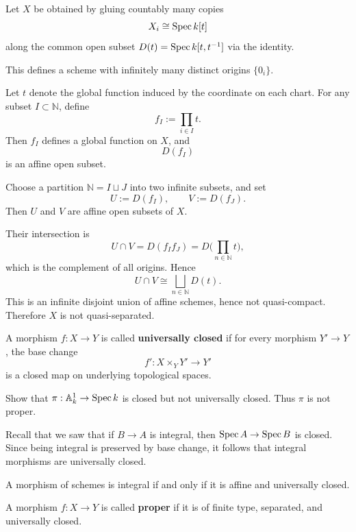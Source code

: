 \documentclass[12pt]{article}
\begin{document}
\begin{example}
    Let $X$ be obtained by gluing countably many copies
    \[
        X_i \cong \operatorname{Spec} k[t]
    \]
    along the common open subset $D(t)=\operatorname{Spec} k[t,t^{-1}]$ via the identity.

    This defines a scheme with infinitely many distinct origins $\{0_i\}$.

    Let $t$ denote the global function induced by the coordinate on each chart. For any subset $I \subset \mathbb N$, define
    \[
        f_I := \prod_{i \in I} t.
    \]
    Then $f_I$ defines a global function on $X$, and
    \[
        D(f_I)
    \]
    is an affine open subset.

    Choose a partition $\mathbb N = I \sqcup J$ into two infinite subsets, and set
    \[
        U := D(f_I), \qquad V := D(f_J).
    \]
    Then $U$ and $V$ are affine open subsets of $X$.

    Their intersection is
    \[
        U \cap V = D(f_I f_J) = D\Big(\prod_{n\in \mathbb N} t\Big),
    \]
    which is the complement of all origins. Hence
    \[
        U \cap V \cong \bigsqcup_{n\in \mathbb N} D(t).
    \]
    This is an infinite disjoint union of affine schemes, hence not quasi-compact. Therefore $X$ is not quasi-separated.
\end{example}

\begin{definition}
    A morphism $f:X\to Y$ is called \textbf{universally closed} if for every morphism $Y'\to Y$, the base change
    \[
        f':X\times_Y Y' \to Y'
    \]
    is a closed map on underlying topological spaces.
\end{definition}

\begin{exercise}
    Show that $\pi:\mathbb A^1_k \to \operatorname{Spec} k$ is closed but not universally closed. Thus $\pi$ is not proper.
\end{exercise}

Recall that we saw that if $B\to A$ is integral, then $\operatorname{Spec} A \to \operatorname{Spec} B$ is closed. Since being integral is preserved by base change, it follows that integral morphisms are universally closed.

\begin{proposition}
    A morphism of schemes is integral if and only if it is affine and universally closed.
\end{proposition}

\begin{definition}
    A morphism $f:X\to Y$ is called \textbf{proper} if it is of finite type, separated, and universally closed.
\end{definition}
\end{document}
